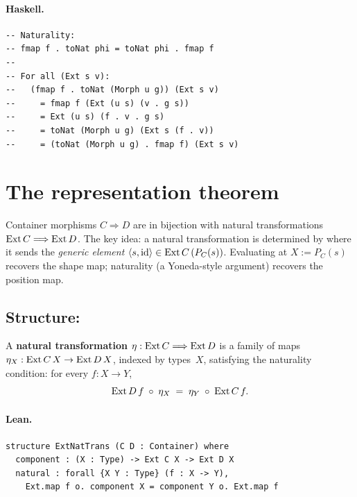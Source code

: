 \documentclass[11pt,a4paper]{article}
\begin{document}
\paragraph{Haskell.}
\begin{lstlisting}[style=haskell]
-- Naturality:
-- fmap f . toNat phi = toNat phi . fmap f
--
-- For all (Ext s v):
--   (fmap f . toNat (Morph u g)) (Ext s v)
--     = fmap f (Ext (u s) (v . g s))
--     = Ext (u s) (f . v . g s)
--     = toNat (Morph u g) (Ext s (f . v))
--     = (toNat (Morph u g) . fmap f) (Ext s v)
\end{lstlisting}


\section{The representation theorem}

Container morphisms $C \Rightarrow D$ are in bijection with natural
transformations $\mathrm{Ext}\,C \Longrightarrow \mathrm{Ext}\,D$.  The key idea: a natural
transformation is determined by where it sends the \emph{generic element}
$\langle s, \mathrm{id} \rangle \in \mathrm{Ext}\,C\,(P_C(s))$.  Evaluating at
$X := P_C(s)$ recovers the shape map; naturality (a Yoneda-style argument)
recovers the position map.

\subsection{Structure: }

\begin{defn}
A \textbf{natural transformation} $\eta : \mathrm{Ext}\,C \Longrightarrow \mathrm{Ext}\,D$
is a family of maps $\eta_X : \mathrm{Ext}\,C\,X \to \mathrm{Ext}\,D\,X$, indexed by
types~$X$, satisfying the naturality condition: for every $f : X \to Y$,
\[
  \mathrm{Ext}\,D\,f \;\circ\; \eta_X
  \;=\;
  \eta_Y \;\circ\; \mathrm{Ext}\,C\,f.
\]
\end{defn}

\paragraph{Lean.}
\begin{lstlisting}[style=lean]
structure ExtNatTrans (C D : Container) where
  component : (X : Type) -> Ext C X -> Ext D X
  natural : forall {X Y : Type} (f : X -> Y),
    Ext.map f o. component X = component Y o. Ext.map f
\end{lstlisting}
\end{document}
